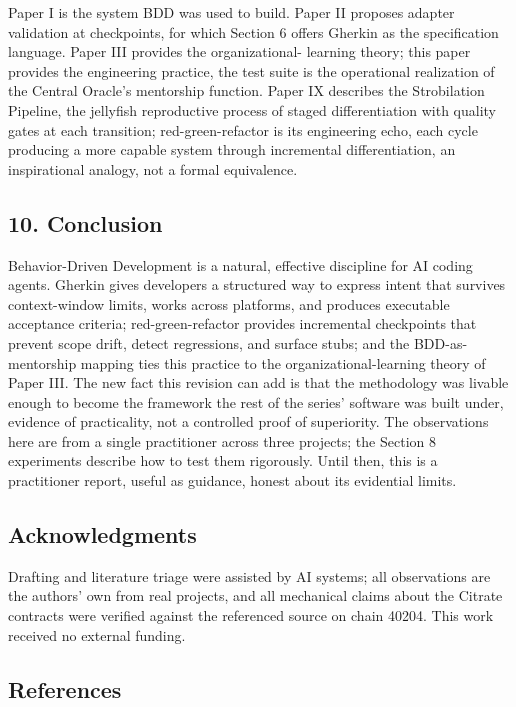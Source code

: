 Paper I is the system BDD was used to build. Paper II proposes adapter
validation at checkpoints, for which Section 6 offers Gherkin as the
specification language. Paper III provides the organizational- learning
theory; this paper provides the engineering practice, the test suite is
the operational realization of the Central Oracle's mentorship function.
Paper IX describes the Strobilation Pipeline, the jellyfish reproductive
process of staged differentiation with quality gates at each transition;
red-green-refactor is its engineering echo, each cycle producing a more
capable system through incremental differentiation, an inspirational
analogy, not a formal equivalence.

\subsection{10. Conclusion}\label{conclusion}

Behavior-Driven Development is a natural, effective discipline for AI
coding agents. Gherkin gives developers a structured way to express
intent that survives context-window limits, works across platforms, and
produces executable acceptance criteria; red-green-refactor provides
incremental checkpoints that prevent scope drift, detect regressions,
and surface stubs; and the BDD-as-mentorship mapping ties this practice
to the organizational-learning theory of Paper III. The new fact this
revision can add is that the methodology was livable enough to become
the framework the rest of the series' software was built under, evidence
of practicality, not a controlled proof of superiority. The observations
here are from a single practitioner across three projects; the Section 8
experiments describe how to test them rigorously. Until then, this is a
practitioner report, useful as guidance, honest about its evidential
limits.

\subsection{Acknowledgments}\label{acknowledgments}

Drafting and literature triage were assisted by AI systems; all
observations are the authors' own from real projects, and all mechanical
claims about the Citrate contracts were verified against the referenced
source on chain 40204. This work received no external funding.

\subsection{References}\label{references}

